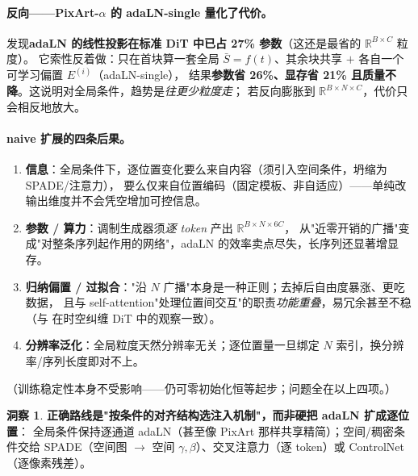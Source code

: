 \documentclass[11pt]{ctexart}
\newcommand{\R}{\mathbb{R}}
\theoremstyle{definition}
\newtheorem{insight}{洞察}[section]
\begin{document}
\paragraph{反向——PixArt-$\alpha$ 的 adaLN-single 量化了代价。}
\cite{pixart} 发现\textbf{adaLN 的线性投影在标准 DiT 中已占 27\% 参数}（这还是最省的 $\R^{B\times C}$ 粒度）。
它索性反着做：只在首块算一套全局 $\bar S=f(t)$、其余块共享 $+$ 各自一个可学习偏置 $E^{(i)}$（adaLN-single），
结果\textbf{参数省 26\%、显存省 21\% 且质量不降}。这说明对全局条件，趋势是\emph{往更少粒度走}；
若反向膨胀到 $\R^{B\times N\times C}$，代价只会相反地放大。

\paragraph{naive 扩展的四条后果。}
\begin{enumerate}[label=(\arabic*)]
  \item \textbf{信息}：全局条件下，逐位置变化要么来自内容（须引入空间条件，坍缩为 SPADE/注意力），
        要么仅来自位置编码（固定模板、非自适应）——单纯改输出维度并不会凭空增加可控信息。
  \item \textbf{参数 / 算力}：调制生成器须\emph{逐 token} 产出 $\R^{B\times N\times 6C}$，
        从"近零开销的广播"变成"对整条序列起作用的网络"，adaLN 的效率卖点尽失，长序列还显著增显存。
  \item \textbf{归纳偏置 / 过拟合}："沿 $N$ 广播"本身是一种正则；去掉后自由度暴涨、更吃数据，
        且与 self-attention"处理位置间交互"的职责\emph{功能重叠}，易冗余甚至不稳
        （与 \cite{vd3d} 在时空纠缠 DiT 中的观察一致）。
  \item \textbf{分辨率泛化}：全局粒度天然分辨率无关；逐位置量一旦绑定 $N$ 索引，换分辨率/序列长度即对不上。
\end{enumerate}
（训练稳定性本身不受影响——仍可零初始化恒等起步；问题全在以上四项。）

\begin{insight}
\textbf{正确路线是"按条件的对齐结构选注入机制"，而非硬把 adaLN 扩成逐位置}：
全局条件保持逐通道 adaLN（甚至像 PixArt 那样共享精简）；空间/稠密条件交给
SPADE（空间图 $\to$ 空间 $\gamma,\beta$）、交叉注意力（逐 token）或 ControlNet（逐像素残差）。
\end{insight}
\end{document}
